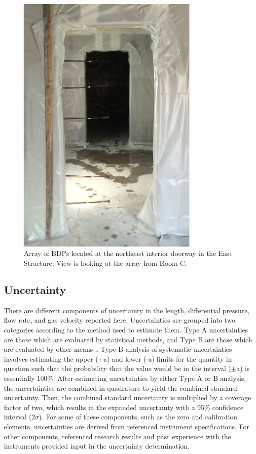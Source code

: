 \documentclass[12pt,oneside]{book}
\begin{document}
\begin{figure}[!ht]
	\includegraphics[width=3.5in]{../Figures/Pictures/BDPs_east}
	\caption[Array of BDPs at interior doorway in East Structure.]{Array of BDPs located at the northeast interior doorway in the East Structure. View is looking at the array from Room C.}
	\label{fig:BDPs}
\end{figure}
\FloatBarrier

\subsection{Uncertainty}
\label{sec:uncertainty}
There are different components of uncertainty in the length, differential pressure, flow rate, and gas velocity reported here. Uncertainties are grouped into two categories according to the method used to estimate them. Type A uncertainties are those which are evaluated by statistical methods, and Type B are those which are evaluated by other means~\cite{Taylor&Kuyatt:1994}. Type B analysis of systematic uncertainties involves estimating the upper (+a) and lower (-a) limits for the quantity in question such that the probability that the value would be in the interval ($\pm$a) is essentially 100\%. After estimating uncertainties by either Type A or B analysis, the uncertainties are combined in quadrature to yield the combined standard uncertainty. Then, the combined standard uncertainty is multiplied by a coverage factor of two, which results in the expanded uncertainty with a 95\% confidence interval (2$\sigma$). For some of these components, such as the zero and calibration elements, uncertainties are derived from referenced instrument specifications. For other components, referenced research results and past experience with the instruments provided input in the uncertainty determination. 
\end{document}
